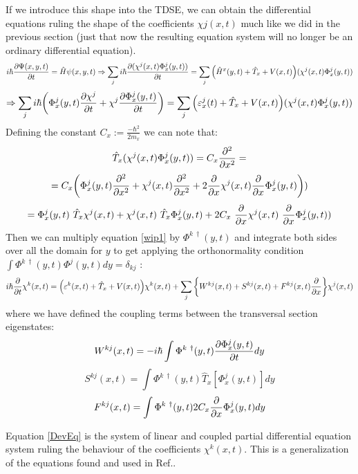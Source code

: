 \documentclass[11pt, a4paper]{article} %
\begin{document}
If we introduce this shape into the TDSE, we can obtain the differential equations ruling the shape of the coefficients $\chi j(x,t)$ much like we did in the previous section (just that now the resulting equation system will no longer be an ordinary differential equation).
\begin{equation}\label{wip1}
i\hbar \pdv{\Psi(x,y,t)}{t}=\hat{H}\psi(x,y,t)\Rightarrow \sum_j i\hbar \pdv{(\chi^j(x,t)\Phi^j_x(y,t))}{t}=\sum_j\qty(\hat{H}^x(y,t)+\hat{T}_x+V(x,t))(\chi^j(x,t)\Phi^j_x(y,t))
\end{equation}
$$
\Rightarrow \sum_j i\hbar\qty( \Phi^j_x(y,t)\pdv{\chi^j}{t} + \chi^j\pdv{\Phi^j_x(y,t)}{t}) = \sum_j\qty(\varepsilon^j_x(t)+\hat{T}_x+V(x,t))(\chi^j(x,t)\Phi^j_x(y,t))
$$
Defining the constant $C_x:=\frac{-\hbar^2}{2m_x}$ we can note that:
\begin{equation}
\hat{T}_x (\chi^j(x,t)\Phi^j_x(y,t)) = C_x\pdv[2]{}{x}(\chi^j(x,t)\Phi^j_x(y,t))=
\end{equation}
$$
=C_x\qty(\Phi^j_x(y,t)\pdv[2]{}{x}(\chi^j(x,t))+\chi^j(x,t)\pdv[2]{}{x}(\Phi^j_x(y,t)) +2 \pdv{}{x}\chi^j(x,t) \pdv{}{x}\Phi^j_x(y,t)))
$$
$$
=\Phi^j_x(y,t)\ \hat{T}_x \chi^j(x,t) + \chi^j(x,t)\  \hat{T}_x  \Phi^j_x(y,t) +2C_x\ \pdv{}{x}\chi^j(x,t)\ \pdv{}{x}\Phi^j_x(y,t))
$$
Then we can multiply equation \eqref{wip1} by $\Phi^{k\ \dagger}(y,t)$ and integrate both sides over all the domain for $y$ to get applying the orthonormality condition $\int \Phi^{k\ \dagger}(y,t) \Phi^{j}(y,t) dy= \delta_{kj}$ :
\begin{equation}\label{DevEq}
i\hbar \pdv{}{t}\chi^k(x,t) = \qty( \varepsilon^k(x,t) + \hat{T}_x+V(x,t))\chi^k(x,t)+ \sum_j \qty{ W^{kj}(x,t) + S^{kj}(x,t)+F^{kj}(x,t)\pdv{}{x} } \chi^j(x,t) 
\end{equation}
where we have defined the coupling terms between the transversal section eigenstates:
\begin{equation}
W^{kj}(x,t) = -i\hbar\int \Phi^{k\ \dagger}(y,t) \pdv{\Phi^j_x(y,t)}{t} dy
\end{equation}
\begin{equation}
S^{kj}(x,t) = \int \Phi^{k\ \dagger}(y,t) \hat{T}_x [\Phi^j_x(y,t)] dy
\end{equation}
\begin{equation}
F^{kj}(x,t) = \int \Phi^{k\ \dagger}(y,t) 2C_x \pdv{}{x}\Phi^j_x(y,t) dy
\end{equation}

Equation \eqref{DevEq} is the system of linear and coupled partial differential equation system ruling the behaviour of the coefficients $\chi^k(x,t)$. This is a generalization of the equations found and used in Ref.\cite{Dev}.
\end{document}
